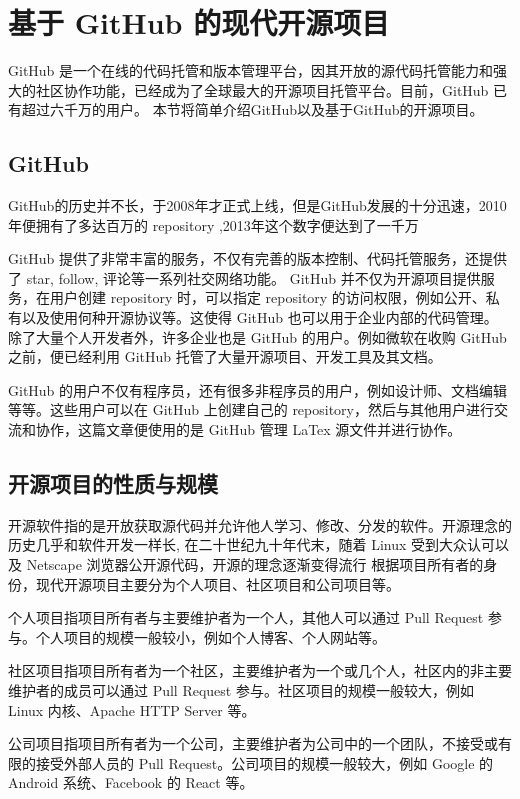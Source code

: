\documentclass[../main.tex]{subfiles}
\begin{document}
\section{基于 GitHub 的现代开源项目}
GitHub 是一个在线的代码托管和版本管理平台，因其开放的源代码托管能力和强大的社区协作功能，已经成为了全球最大的开源项目托管平台。目前，GitHub 已有超过六千万的用户。
本节将简单介绍GitHub以及基于GitHub的开源项目。
\subsection{GitHub}

GitHub的历史并不长，于2008年才正式上线，但是GitHub发展的十分迅速，2010年便拥有了多达百万的 repository \cite{github_million},2013年这个数字便达到了一千万\cite{github_ten_million}

GitHub 提供了非常丰富的服务，不仅有完善的版本控制、代码托管服务，还提供了 star, follow, 评论等一系列社交网络功能。
GitHub 并不仅为开源项目提供服务，在用户创建 repository 时，可以指定 repository 的访问权限，例如公开、私有以及使用何种开源协议等。这使得 GitHub 也可以用于企业内部的代码管理。
除了大量个人开发者外，许多企业也是 GitHub 的用户。例如微软在收购 GitHub 之前，便已经利用 GitHub 托管了大量开源项目、开发工具及其文档。

GitHub 的用户不仅有程序员，还有很多非程序员的用户，例如设计师、文档编辑等等。这些用户可以在 GitHub 上创建自己的 repository，然后与其他用户进行交流和协作，这篇文章便使用的是 GitHub 管理 LaTex 源文件并进行协作。

\subsection{开源项目的性质与规模}

开源软件指的是开放获取源代码并允许他人学习、修改、分发的软件。开源理念的历史几乎和软件开发一样长, 
在二十世纪九十年代末，随着 Linux 受到大众认可以及 Netscape 浏览器公开源代码，开源的理念逐渐变得流行\cite{opensource}
根据项目所有者的身份，现代开源项目主要分为个人项目、社区项目和公司项目等。

个人项目指项目所有者与主要维护者为一个人，其他人可以通过 Pull Request 参与。个人项目的规模一般较小，例如个人博客、个人网站等。

社区项目指项目所有者为一个社区，主要维护者为一个或几个人，社区内的非主要维护者的成员可以通过 Pull Request 参与。社区项目的规模一般较大，例如 Linux 内核、Apache HTTP Server 等。

公司项目指项目所有者为一个公司，主要维护者为公司中的一个团队，不接受或有限的接受外部人员的 Pull Request。公司项目的规模一般较大，例如 Google 的 Android 系统、Facebook 的 React 等。
\end{document}
